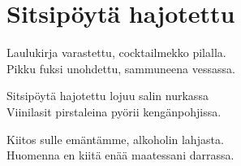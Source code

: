 \section{Sitsipöytä hajotettu}


Laulukirja varastettu, cocktailmekko pilalla.\\
Pikku fuksi unohdettu, sammuneena vessassa.

Sitsipöytä hajotettu lojuu salin nurkassa\\
Viinilasit pirstaleina pyörii kengänpohjissa.

Kiitos sulle emäntämme, alkoholin lahjasta.\\
Huomenna en kiitä enää maatessani darrassa.